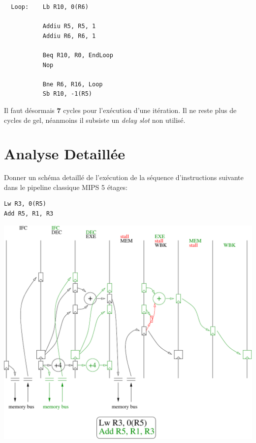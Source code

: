 \begin{correction}

  \begin{verbatim}
  Loop:    Lb R10, 0(R6)

           Addiu R5, R5, 1
           Addiu R6, R6, 1

           Beq R10, R0, EndLoop
           Nop

           Bne R6, R16, Loop
           Sb R10, -1(R5)
  \end{verbatim}

  Il faut d\'esormais \textbf{7} cycles pour l'ex\'ecution d'une it\'eration.
  Il ne reste plus de cycles de gel, n\'eanmoins il subsiste un
  \textit{delay slot} non utilis\'e.

\end{correction}

%
%

\section{Analyse Detaill\'ee}

Donner un sch\'ema detaill\'e de l'ex\'ecution de la s\'equence d'instructions
suivante dans le pipeline classique MIPS 5 \'etages:

\begin{verbatim}
Lw R3, 0(R5)
Add R5, R1, R3
\end{verbatim}

\begin{correction}

  \begin{center}
    \includegraphics[scale=0.8]{figures/correction-analyse-detaillee.pdf}
  \end{center}

\end{correction}

